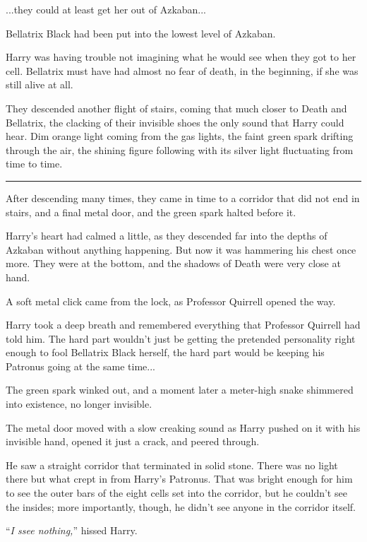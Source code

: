 ...they could at least get her out of Azkaban...

Bellatrix Black had been put into the lowest level of Azkaban.

Harry was having trouble not imagining what he would see when they got to her cell. Bellatrix must have had almost no fear of death, in the beginning, if she was still alive at all.

They descended another flight of stairs, coming that much closer to Death and Bellatrix, the clacking of their invisible shoes the only sound that Harry could hear. Dim orange light coming from the gas lights, the faint green spark drifting through the air, the shining figure following with its silver light fluctuating from time to time.

\begin{center}\rule{3in}{0.4pt}\end{center}

After descending many times, they came in time to a corridor that did not end in stairs, and a final metal door, and the green spark halted before it.

Harry's heart had calmed a little, as they descended far into the depths of Azkaban without anything happening. But now it was hammering his chest once more. They were at the bottom, and the shadows of Death were very close at hand.

A soft metal click came from the lock, as Professor Quirrell opened the way.

Harry took a deep breath and remembered everything that Professor Quirrell had told him. The hard part wouldn't just be getting the pretended personality right enough to fool Bellatrix Black herself, the hard part would be keeping his Patronus going at the same time...

The green spark winked out, and a moment later a meter-high snake shimmered into existence, no longer invisible.

The metal door moved with a slow creaking sound as Harry pushed on it with his invisible hand, opened it just a crack, and peered through.

He saw a straight corridor that terminated in solid stone. There was no light there but what crept in from Harry's Patronus. That was bright enough for him to see the outer bars of the eight cells set into the corridor, but he couldn't see the insides; more importantly, though, he didn't see anyone in the corridor itself.

``\emph{I ssee nothing,}'' hissed Harry.

